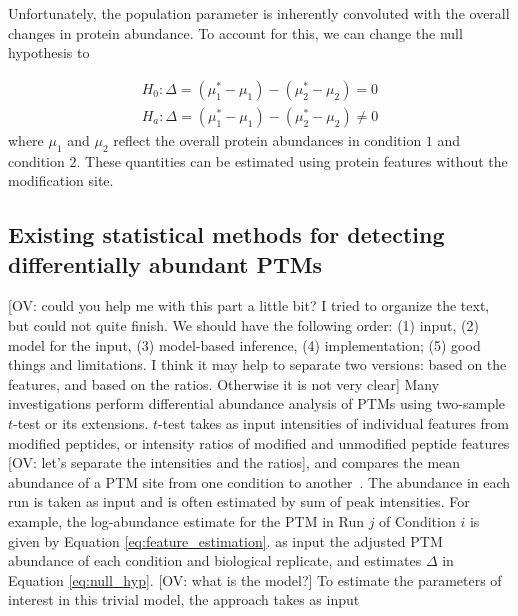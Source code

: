 \documentclass[mcp]{article}
\numberwithin{table}{section}
\def\todo#1{{\color{red}[#1]}}
\begin{document}
Unfortunately, the population parameter is inherently convoluted with the overall changes in protein abundance. To account for this, we can change the null hypothesis to

\begin{equation}
\begin{aligned}
H_{0}: \Delta = ( \mu_{1}^{\ast} - \mu_{1}) - ( \mu_{2}^{\ast} - \mu_{2} ) = 0 \\
H_{a}: \Delta = ( \mu_{1}^{\ast} - \mu_{1}) - ( \mu_{2}^{\ast} - \mu_{2} ) \neq 0
\end{aligned}
\label{eq:null_hyp}
\end{equation}
where $\mu_1$ and $\mu_2$ reflect the overall protein abundances in condition $1$ and condition $2$. These quantities can be estimated using protein features without the modification site.


\subsection*{Existing statistical methods for detecting differentially abundant PTMs}

\todo{OV: could you help me with this part a little bit? I tried to organize the text, but could not quite finish. We should have the following order: (1) input, (2) model for the input, (3) model-based inference, (4) implementation; (5) good things and limitations. I think it may help to separate two versions: based on the features, and based on the ratios. Otherwise it is not very clear}
Many investigations perform differential abundance analysis of PTMs using two-sample $t$-test or its extensions. $t$-test takes as input intensities of individual features from modified peptides, or intensity ratios of modified and unmodified peptide features \todo{OV: let's separate the intensities and the ratios}, and compares the mean abundance of a PTM site from one condition to another~\cite{Schwammle2015}\cite{THOMAS2020}. The abundance in each run is taken as input and is often estimated by sum of peak intensities. For example, the log-abundance estimate for the PTM in Run $j$ of Condition $i$ is given by Equation \ref{eq:feature_estimation}. as input the adjusted PTM abundance of each condition and biological replicate, and estimates $\Delta$ in Equation \ref{eq:null_hyp}.
\todo{OV: what is the model?}
To estimate the parameters of interest in this trivial model, the approach takes as input 
\end{document}
